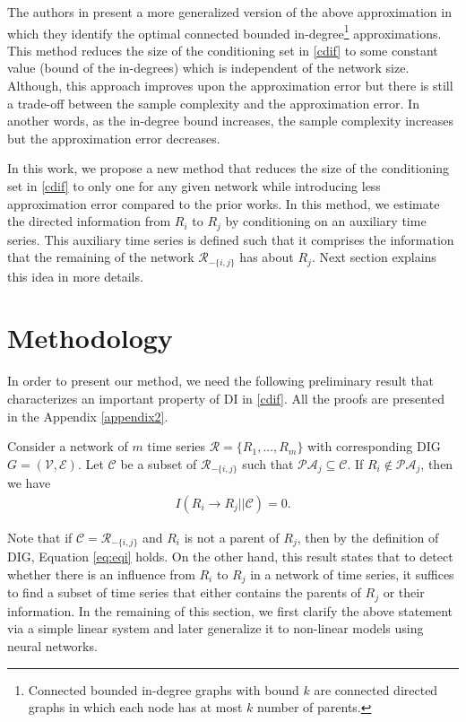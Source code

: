 The authors in \citet{quinn2015bounded} present a more generalized version of the above approximation in which they identify the optimal connected bounded in-degree\footnote{Connected bounded in-degree graphs with bound $k$ are connected directed graphs in which each node has at most $k$ number of parents.} approximations.  
This method reduces the size of the conditioning set in \eqref{cdif} to some constant value (bound of the in-degrees) which is independent of the network size. 
Although, this approach improves upon the approximation error but there is still a trade-off between the sample complexity and the approximation error. In another words, as the in-degree bound increases, the sample complexity increases but the approximation error decreases.


In this work, we propose a new method that reduces the size of the conditioning set in \eqref{cdif} to only one for any given network while introducing less approximation error compared to the prior works. 
In this method, we estimate the directed information from $R_i$ to $R_j$ by conditioning on an auxiliary time series. This auxiliary time series is defined such that it comprises the information that the remaining of the network $\mathcal{R}_{-\{i,j\}}$ has about $R_j$.
Next section explains this idea in more details.

\clearpage

\section{Methodology}\label{sec:method}

In order to present our method, we need the following preliminary result that characterizes an important property of DI in \eqref{cdif}. All the proofs are presented in the Appendix \ref{appendix2}.

\begin{lemma}\label{lemma:small}
Consider a network of $m$ time series $\mathcal{R}=\{R_1,...,R_m\}$ with corresponding DIG $G=(\mathcal{V},\mathcal{E})$. Let $\mathcal{C}$ be a subset of $\mathcal{R}_{-\{i,j\}}$ such that $\mathcal{PA}_j\subseteq \mathcal{C}$. If $R_i\not\in\mathcal{PA}_j$, then we have
\begin{align}\label{eq:eqi}
I(R_i\rightarrow R_j||\mathcal{C})=0.
\end{align}
\end{lemma}
Note that if $\mathcal{C}=\mathcal{R}_{-\{i,j\}}$ and $R_i$ is not a parent of $R_j$, then by the definition of DIG, Equation  \eqref{eq:eqi} holds.
On the other hand, this result states that to detect whether there is an influence from $R_i$ to $R_j$ in a network of time series, it suffices to find a subset of time series that either contains the parents of $R_j$ or their information.
In the remaining of this section, we first clarify the above statement via a simple linear system and later generalize it to non-linear models using neural networks.

